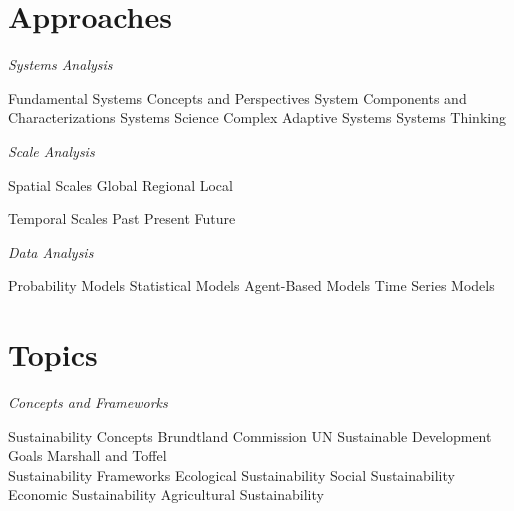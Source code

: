 \documentclass[12pt, letterpaper]{article}
\begin{document}
\section{Approaches}

\large
\begin{flushleft}
\textit{Systems Analysis}
\end{flushleft}

\normalsize

\begin{outline}[enumerate]
\1 Fundamental Systems Concepts and Perspectives
\2 System Components and Characterizations
\2 Systems Science
\2 Complex Adaptive Systems
\2 Systems Thinking
\end{outline}


\large
\begin{flushleft}
\textit{Scale Analysis}
\end{flushleft}

\normalsize
\begin{outline}[enumerate]
\1 Spatial Scales
\2 Global
\2 Regional
\2 Local

\1 Temporal Scales
\2 Past
\2 Present
\2 Future
\end{outline}


\large
\begin{flushleft}
\textit{Data Analysis}
\end{flushleft}

\normalsize
\begin{outline}[enumerate]
\1 Probability Models
\1 Statistical Models
\1 Agent-Based Models
\1 Time Series Models

\end{outline}


\section{Topics}

\large
\begin{flushleft}
\textit{Concepts and Frameworks}
\end{flushleft}

\normalsize

\begin{outline}[enumerate]
\1 Sustainability Concepts
\2 Brundtland Commission
\2 UN Sustainable Development Goals
\2 Marshall and Toffel\\

\1 Sustainability Frameworks
\2 Ecological Sustainability
\2 Social Sustainability
\2 Economic Sustainability
\2 Agricultural Sustainability
\end{outline}
\end{document}
